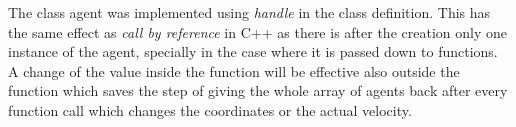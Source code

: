 \noi The class agent was implemented using \textit{handle} in the class definition. This has the same effect as \textit{call by reference} in C++ as there is after the creation only one instance of the agent, specially in the case where it is passed down to functions. A change of the value inside the function will be effective also outside the function which saves the step of giving the whole array of agents back after every function call which changes the coordinates or the actual velocity.




